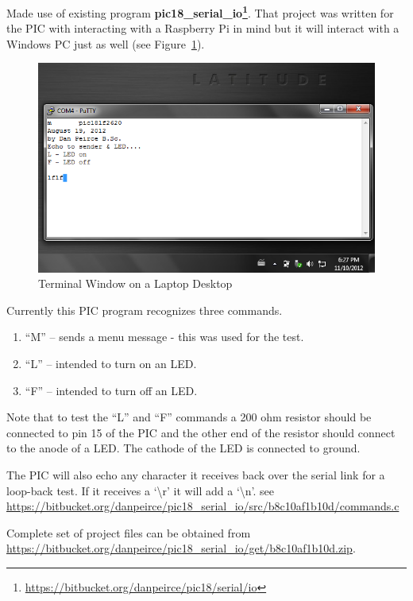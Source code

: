 \documentclass[twocolumn]{article}
\makeatletter
\def\maxwidth{\ifdim\Gin@nat@width>\linewidth\linewidth
\else\Gin@nat@width\fi}
\let\Oldincludegraphics\includegraphics
\renewcommand{\includegraphics}[1]{\Oldincludegraphics[width=\maxwidth]{#1}}
\makeatother
\begin{document}
Made use of existing program
\textbf{pic18\_serial\_io\footnote{\url{https://bitbucket.org/danpeirce/pic18/serial/io}}}.
That project was written for the PIC with interacting with a Raspberry
Pi in mind but it will interact with a Windows PC just as well (see Figure~\ref{putty}).
\begin{figure}[htbp]
\centering
\includegraphics{phys1600/putty_laptop_desktop.png}
\caption{Terminal Window on a Laptop Desktop}
\label{putty}
\end{figure}

Currently this PIC program recognizes three commands.

\begin{enumerate}[1.]
\item
  ``M'' -- sends a menu message - this was used for the test.
\item
  ``L'' -- intended to turn on an LED.
\item
  ``F'' -- intended to turn off an LED.
\end{enumerate}

Note that to test the ``L'' and ``F'' commands a 200 ohm resistor should
be connected to pin 15 of the PIC and the other end of the resistor
should connect to the anode of a LED. The cathode of the LED is
connected to ground.

The PIC will also echo any character it receives back over the serial
link for a loop-back test. If it receives a `\textbackslash{}r' it will add a `\textbackslash{}n'. see
\url{https://bitbucket.org/danpeirce/pic18_serial_io/src/b8c10af1b10d/commands.c}

Complete set of project files can be obtained from
\url{https://bitbucket.org/danpeirce/pic18_serial_io/get/b8c10af1b10d.zip}.
\end{document}
